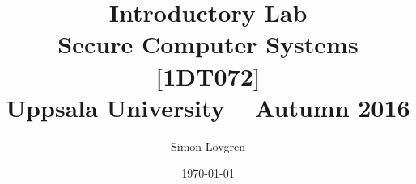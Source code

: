 \documentclass[a4paper,11pt]{article}
\title{\textbf{Introductory Lab \\
    Secure Computer Systems [1DT072]} \\[1em]
\large{Uppsala University -- Autumn 2016}}
\author{Simon Lövgren}
\date{\today}
\begin{document}
\maketitle
\pagebreak
\tableofcontents
\pagebreak



\pagebreak


\end{document}

